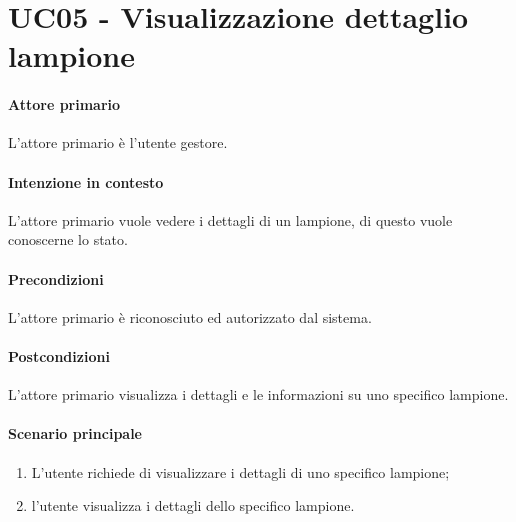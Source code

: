 \section{UC05 - Visualizzazione dettaglio lampione}
\paragraph{Attore primario} L'attore primario è l'utente gestore.
\paragraph{Intenzione in contesto} L'attore primario vuole vedere i dettagli di un lampione, di questo vuole conoscerne lo stato.
\paragraph{Precondizioni}L'attore primario è riconosciuto ed autorizzato dal sistema.
\paragraph{Postcondizioni} L'attore primario visualizza i dettagli e le informazioni su uno specifico lampione.
\paragraph{Scenario principale}
\begin{enumerate}
    \item L'utente richiede di visualizzare i dettagli di uno specifico lampione;
    \item l'utente visualizza i dettagli dello specifico lampione.
\end{enumerate}